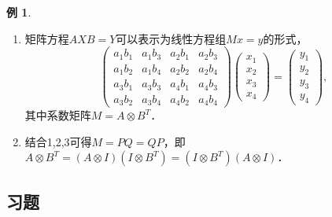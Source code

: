 \documentclass[a4paper,fontset=windows]{ctexbook}
\theoremstyle{definition}
\newtheorem{example}{例}[chapter]
\begin{document}
\begin{example}
\begin{enumerate}
\item 矩阵方程$AXB=Y$可以表示为线性方程组$Mx=y$的形式，
$$\begin{pmatrix}a_1b_1&a_1b_3&a_2b_1&a_2b_3 \\ a_1b_2&a_1b_4&a_2b_2&a_2b_4 \\ a_3b_1&a_3b_3&a_4b_1&a_4b_3 \\ a_3b_2&a_3b_4&a_4b_2&a_4b_4\end{pmatrix}\begin{pmatrix}x_1 \\ x_2 \\ x_3 \\ x_4\end{pmatrix}=\begin{pmatrix}y_1 \\ y_2 \\ y_3 \\ y_4\end{pmatrix},$$
其中系数矩阵$M=A\otimes B^T$．

\item 结合1,2,3可得$M=PQ=QP$，即$A\otimes B^T=(A\otimes I)(I\otimes B^T)=(I\otimes B^T)(A\otimes I)$．
\end{enumerate}
\end{example}

\subsection*{习题}
\end{document}
